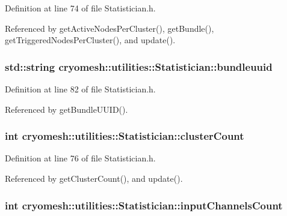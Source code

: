 \-Definition at line 74 of file \-Statistician.\-h.



\-Referenced by get\-Active\-Nodes\-Per\-Cluster(), get\-Bundle(), get\-Triggered\-Nodes\-Per\-Cluster(), and update().

\hypertarget{classcryomesh_1_1utilities_1_1Statistician_af2c7a19dfd7c305b1767a3abec4cb75e}{
\subsubsection[{bundleuuid}]{\setlength{\rightskip}{0pt plus 5cm}std\-::string {\bf cryomesh\-::utilities\-::\-Statistician\-::bundleuuid}}}\label{classcryomesh_1_1utilities_1_1Statistician_af2c7a19dfd7c305b1767a3abec4cb75e}


\-Definition at line 82 of file \-Statistician.\-h.



\-Referenced by get\-Bundle\-U\-U\-I\-D().

\hypertarget{classcryomesh_1_1utilities_1_1Statistician_af6b5d81fc1b6821e7fff8d4ccbcf15bb}{
\subsubsection[{cluster\-Count}]{\setlength{\rightskip}{0pt plus 5cm}int {\bf cryomesh\-::utilities\-::\-Statistician\-::cluster\-Count}}}\label{classcryomesh_1_1utilities_1_1Statistician_af6b5d81fc1b6821e7fff8d4ccbcf15bb}


\-Definition at line 76 of file \-Statistician.\-h.



\-Referenced by get\-Cluster\-Count(), and update().

\hypertarget{classcryomesh_1_1utilities_1_1Statistician_a734a2d7317a2d1a08dfa64a6f5a7da8c}{
\subsubsection[{input\-Channels\-Count}]{\setlength{\rightskip}{0pt plus 5cm}int {\bf cryomesh\-::utilities\-::\-Statistician\-::input\-Channels\-Count}}}\label{classcryomesh_1_1utilities_1_1Statistician_a734a2d7317a2d1a08dfa64a6f5a7da8c}


